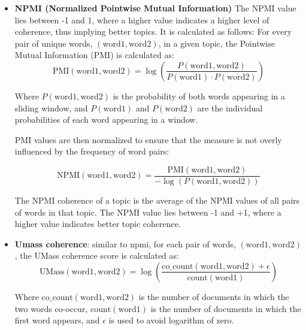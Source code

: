 \begin{itemize}
    \item \textbf{NPMI (Normalized Pointwise Mutual Information)} The NPMI value lies between -1 and 1, where a higher value indicates a higher level of coherence, thus implying better topics. It is calculated as follows: 
    For every pair of unique words, $(\text{{word1}}, \text{{word2}})$, in a given topic, the Pointwise Mutual Information (PMI) is calculated as:
    \begin{equation} 
    \text{{PMI}}(\text{{word1}}, \text{{word2}}) = \log\left(\frac{P(\text{{word1}}, \text{{word2}})}{P(\text{{word1}}) \cdot P(\text{{word2}})} \right)
    \end{equation}
    
    Where $P(\text{{word1}}, \text{{word2}})$ is the probability of both words appearing in a sliding window, and $P(\text{{word1}})$ and $P(\text{{word2}})$ are the individual probabilities of each word appearing in a window.
    
    PMI values are then normalized to ensure that the measure is not overly influenced by the frequency of word pairs:
    
    \begin{equation} 
    \text{{NPMI}}(\text{{word1}}, \text{{word2}}) = \frac{\text{{PMI}} (\text{{word1}}, \text{{word2}})}{-\log(P(\text{{word1}}, \text{{word2}}))}
    \end{equation}
    
    The NPMI coherence of a topic is the average of the NPMI values of all pairs of words in that topic. The NPMI value lies between -1 and +1, where a higher value indicates better topic coherence.
    
    
    \item \textbf{Umass coherence}: similar to npmi, 
    for each pair of words, $(\text{{word1}}, \text{{word2}})$, the UMass coherence score is calculated as:
    \begin{equation} 
    \text{{UMass}}(\text{{word1}}, \text{{word2}}) = \log\left(\frac{\text{{co\_count}}(\text{{word1}}, \text{{word2}}) + \epsilon}{\text{{count}}(\text{{word1}})} \right)
    \end{equation}
    
    Where $\text{{co\_count}}(\text{{word1}}, \text{{word2}})$ is the number of documents in which the two words co-occur, $\text{{count}}(\text{{word1}})$ is the number of documents in which the first word appears, and $\epsilon$ is used to avoid logarithm of zero.
    

\end{itemize}
